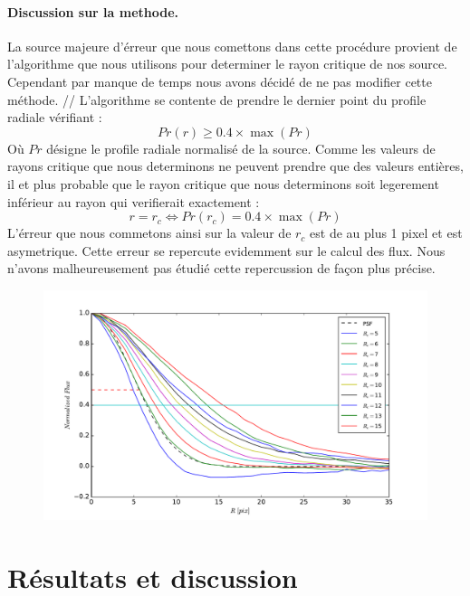 \documentclass[a4paper,11pt]{article}
\begin{document}
\paragraph{Discussion sur la methode.} La source majeure d'érreur que nous comettons dans cette procédure provient 
de l'algorithme que nous utilisons pour determiner le rayon critique de nos source. Cependant par manque de temps
 nous avons décidé de ne pas modifier cette méthode. //
 L'algorithme se contente de prendre le dernier point du profile radiale vérifiant : 
 \begin{equation}
 Pr(r) \ge 0.4\times \max (Pr)
 \end{equation}
 Où $Pr$ désigne le profile radiale normalisé de la source. 
Comme les valeurs de rayons critique que nous determinons ne
peuvent prendre que des valeurs entières, il et plus probable que le rayon critique que nous determinons soit legerement inférieur au 
rayon qui verifierait exactement : 
\begin{equation}
r = r_c \Leftrightarrow Pr(r_c) = 0.4\times \max (Pr)
\end{equation}
L'érreur que nous commetons ainsi sur la valeur de $r_c$ est de au plus 1 pixel et est asymetrique. Cette erreur 
se repercute evidemment sur le calcul des flux. Nous n'avons malheureusement pas étudié cette repercussion de
façon plus précise.

\begin{figure}[h!]
  \centering
  \label{radius}
  \includegraphics[scale = 0.5]{radius.pdf}
  \caption{}
\end{figure}

\section{Résultats et discussion}
\end{document}
